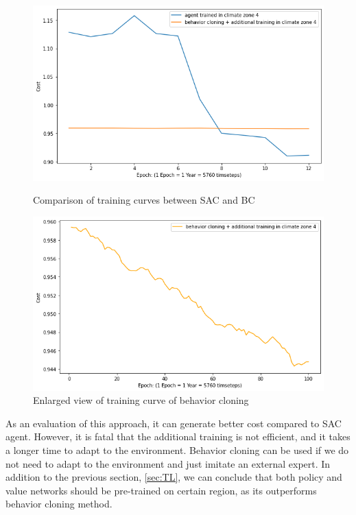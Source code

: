 \documentclass{article}
\begin{document}
\begin{figure}[!tbp]
  \centering
  \begin{minipage}[b]{0.45\textwidth}
    \centering
    \includegraphics[width=\linewidth]{figures/bc_vs_sac.png}
    \caption{Comparison of training curves between SAC and BC}
    \label{fig:bc_vs_sac}
  \end{minipage}
  \hfill
  \begin{minipage}[b]{0.45\textwidth}
    \centering
    \includegraphics[width=\linewidth]{figures/bc_single.png}
    \caption{Enlarged view of training curve of behavior cloning}
    \label{fig:bc_single}
  \end{minipage}
\end{figure}

As an evaluation of this approach, it can generate better cost compared to SAC agent. However, it is fatal that the additional training is not efficient, and it takes a longer time to adapt to the environment. Behavior cloning can be used if we do not need to adapt to the environment and just imitate an external expert. In addition to the previous section, \ref{sec:TL}, we can conclude that both policy and value networks should be pre-trained on certain region, as its outperforms behavior cloning method. 
\end{document}
